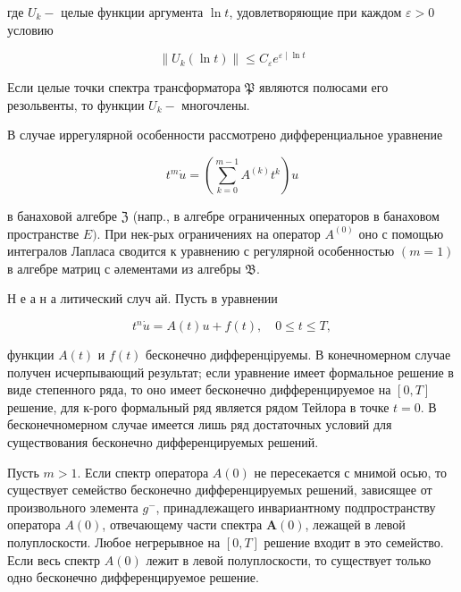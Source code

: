\documentclass[10pt]{article}
\begin{document}
где $U_{k}-$ целые функции аргумента $\ln t$, удовлетворяющие при каждом $\varepsilon>0$ условию



\[

\left\|U_{k}(\ln t)\right\| \leqslant C_{\varepsilon} e^{\varepsilon \mid \ln t}

\]



Если целые точки спектра трансформатора $\mathfrak{P}$ являются полюсами его резольвенты, то функции $U_{k}-$ многочлены.



В случае иррегулярной особенности рассмотрено дифференциальное уравнение



\[

t^{m} \dot{u}=\left(\sum_{k=0}^{m-1} A^{(k)} t^{k}\right) u

\]



в банаховой алгебре $\mathfrak{Z}$ (напр., в алгебре ограниченных операторов в банаховом пространстве $E)$. При нек-рых ограничениях на оператор $A^{(0)}$ оно с помощью интегралов Лапласа сводится к уравнению с регулярной особенностью $(m=1)$ в алгебре матриц с әлементами из алгебры $\mathfrak{B}$.



Н е а н а литический случ ай. Пусть в уравнении



\[

t^{n} \dot{u}=A(t) u+f(t), \quad 0 \leqslant t \leqslant T,

\]



функции $A(t)$ и $f(t)$ бесконечно дифференціруемы. В конечномерном случае получен исчерпывающий результат; если уравнение имеет формальное решение в виде степенного ряда, то оно имеет бесконечно дифференцируемое на $[0, T]$ решение, для к-рого формальный ряд является рядом Тейлора в точке $t=0$. В бесконечномерном случае имеется лишь ряд достаточных условий для существования бесконечно дифференцируемых решений.



Пусть $m>1$. Если спектр оператора $A(0)$ не пересекается с мнимой осью, то существует семейство бесконечно дифференцируемых решений, зависящее от произвольного элемента $g^{-}$, принадлежащего инвариантному подпространству оператора $A(0)$, отвечающему части спектра $\boldsymbol{A}(0)$, лежащей в левой полуплоскости. Любое негрерывное на $[0, T]$ решение входит в это семейство. Если весь спектр $A(0)$ лежит в левой полуплоскости, то существует только одно бесконечно дифференцируемое решение.
\end{document}
